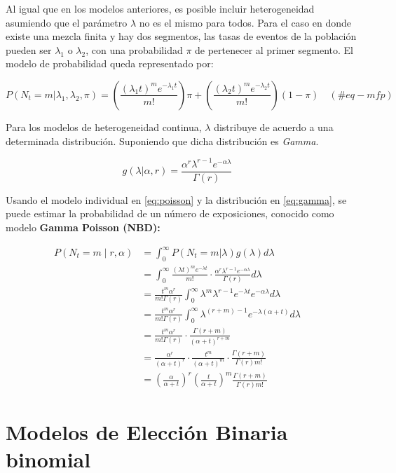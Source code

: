 \documentclass[
]{book}
\begin{document}
Al igual que en los modelos anteriores, es posible incluir
heterogeneidad asumiendo que el parámetro \(\lambda\) no es el mismo para
todos. Para el caso en donde existe una mezcla finita y hay dos
segmentos, las tasas de eventos de la población pueden ser \(\lambda_1\) o
\(\lambda_2\), con una probabilidad \(\pi\) de pertenecer al primer
segmento. El modelo de probabilidad queda representado por:

\[
P(N_t = m | \lambda_1, \lambda_2, \pi) = \left( \frac{(\lambda_1 t)^m e^{-\lambda_1 t}}{m!} \right) \pi + \left( \frac{(\lambda_2 t)^m e^{-\lambda_2 t}}{m!} \right) (1-\pi) \quad (\#eq-mfp)
\]

Para los modelos de heterogeneidad continua, \(\lambda\) distribuye de
acuerdo a una determinada distribución. Suponiendo que dicha
distribución es \emph{Gamma}.

\[
g(\lambda|\alpha, r) = \frac{\alpha^r \lambda^{r-1}e^{-\alpha \lambda}}{\Gamma(r)} \quad \label{eq:gamma}
\]

Usando el modelo individual en \eqref{eq:poisson} y la distribución en
\eqref{eq:gamma}, se puede estimar la probabilidad de un número de
exposiciones, conocido como modelo \textbf{Gamma Poisson (NBD):}

\[
\begin{aligned}
P(N_t = m \mid r, \alpha) &= \int_{0}^{\infty} P(N_t = m|\lambda) g(\lambda)d\lambda \\
&= \int_{0}^{\infty} \frac{(\lambda t)^m e^{-\lambda t}}{m!} \cdot \frac{\alpha^r \lambda^{r-1}e^{-\alpha \lambda}}{\Gamma(r)}d\lambda \\
&= \frac{t^m \alpha^r}{m! \Gamma(r)} \int_{0}^{\infty} \lambda^m \lambda^{r-1} e^{-\lambda t} e^{-\alpha \lambda} d\lambda \\
&= \frac{t^m \alpha^r}{m! \Gamma(r)} \int_{0}^{\infty} \lambda^{(r+m)-1} e^{-\lambda(\alpha+t)} d\lambda \\
&= \frac{t^m \alpha^r}{m! \Gamma(r)} \cdot \frac{\Gamma(r+m)}{(\alpha+t)^{r+m}} \\
&= \frac{\alpha^r}{(\alpha+t)^r} \cdot \frac{t^m}{(\alpha+t)^m} \cdot \frac{\Gamma(r+m)}{\Gamma(r)m!} \\
&= \left( \frac{\alpha}{\alpha+t}\right)^r \left( \frac{t}{\alpha + t}\right)^m \frac{\Gamma(r+m)}{\Gamma(r)m!}
\end{aligned}
\quad \label{eq:gammita}
\]

\section{Modelos de Elección Binaria binomial}\label{modelos-de-elecciuxf3n-binaria-binomial}
\end{document}
